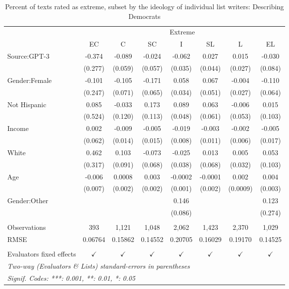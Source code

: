 \documentclass[11pt]{article}
\begin{document}
\begin{table}
\centering
%
\begin{tabular}{lccccccc}
\toprule
&\multicolumn{7}{c}{Extreme}\\
& EC & C & SC & I & SL & L & EL\\
\midrule Source:GPT-3&-0.374 & -0.089 & -0.024 & -0.062 & 0.027 & 0.015 & -0.030\\
  &(0.277) & (0.059) & (0.057) & (0.035) & (0.044) & (0.027) & (0.084)\\
Gender:Female&-0.101 & -0.105 & -0.171 & 0.058 & 0.067 & -0.004 & -0.110\\
  &(0.247) & (0.071) & (0.065) & (0.034) & (0.051) & (0.027) & (0.064)\\
Not Hispanic&0.085 & -0.033 & 0.173 & 0.089 & 0.063 & -0.006 & 0.015\\
  &(0.524) & (0.120) & (0.113) & (0.048) & (0.061) & (0.053) & (0.103)\\
Income&0.002 & -0.009 & -0.005 & -0.019 & -0.003 & -0.002 & -0.005\\
  &(0.062) & (0.014) & (0.015) & (0.008) & (0.011) & (0.006) & (0.017)\\
White&0.462 & 0.103 & -0.073 & -0.025 & 0.013 & 0.005 & 0.053\\
  &(0.317) & (0.091) & (0.068) & (0.038) & (0.068) & (0.032) & (0.103)\\
Age&-0.006 & 0.0008 & 0.003 & -0.0002 & -0.0001 & 0.002 & 0.004\\
  &(0.007) & (0.002) & (0.002) & (0.001) & (0.002) & (0.0009) & (0.003)\\
Gender:Other&   &    &    & 0.146 &    &    & 0.123\\
  &   &    &    & (0.086) &    &    & (0.274)\\
 &  & & & & & & \\
Observations & 393&1,121&1,048&2,062&1,423&2,370&1,029\\
RMSE & 0.06764&0.15862&0.14552&0.20705&0.16029&0.19170&0.14525\\
 &   &   &   &   &   &   &  \\
Evaluators fixed effects & $\checkmark$ & $\checkmark$ & $\checkmark$ & $\checkmark$ & $\checkmark$ & $\checkmark$ & $\checkmark$\\
\bottomrule
\multicolumn{8}{l}{\emph{Two-way (Evaluators \& Lists) standard-errors in parentheses}}\\
\multicolumn{8}{l}{\emph{Signif. Codes: ***: 0.001, **: 0.01, *: 0.05}}\\
\end{tabular}
%
\caption{Percent of texts rated as extreme, subset by the ideology of individual list writers: Describing Democrats}
\label{tab:f4a4}
\end{table}
\end{document}
